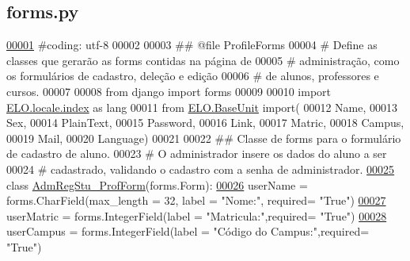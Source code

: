 \hypertarget{Adm_2forms_8py_source}{}\subsection{forms.\+py}
\label{Adm_2forms_8py_source}

\begin{DoxyCode}
\hypertarget{Adm_2forms_8py_source_l00001}{}\hyperlink{namespaceAdm_1_1forms}{00001} \textcolor{comment}{#coding: utf-8}
00002 
00003 \textcolor{comment}{## @file ProfileForms}
00004 \textcolor{comment}{#   Define as classes que gerarão as forms contidas na página de }
00005 \textcolor{comment}{#   administração, como os formulários de cadastro, deleção e edição}
00006 \textcolor{comment}{#   de alunos, professores e cursos.}
00007 
00008 \textcolor{keyword}{from} django \textcolor{keyword}{import} forms
00009 
00010 \textcolor{keyword}{import} \hyperlink{namespaceELO_1_1locale_1_1index}{ELO.locale.index} \textcolor{keyword}{as} lang
00011 \textcolor{keyword}{from} \hyperlink{namespaceELO_1_1BaseUnit}{ELO.BaseUnit} import(
00012     Name,
00013     Sex,
00014     PlainText,
00015     Password,
00016     Link,
00017     Matric,
00018     Campus,
00019     Mail,
00020     Language)
00021 
00022 \textcolor{comment}{## Classe de forms para o formulário de cadastro de aluno.}
00023 \textcolor{comment}{#   O administrador insere os dados do aluno a ser}
00024 \textcolor{comment}{#   cadastrado, validando o cadastro com a senha de administrador.}
\hypertarget{Adm_2forms_8py_source_l00025}{}\hyperlink{classAdm_1_1forms_1_1AdmRegStu__ProfForm}{00025} \textcolor{keyword}{class }\hyperlink{classAdm_1_1forms_1_1AdmRegStu__ProfForm}{AdmRegStu\_ProfForm}(forms.Form):
\hypertarget{Adm_2forms_8py_source_l00026}{}\hyperlink{classAdm_1_1forms_1_1AdmRegStu__ProfForm_a4e5391112a173e2d304e20c2cc8bca4d}{00026}     userName = forms.CharField(max\_length = 32, label = \textcolor{stringliteral}{"Nome:"}, required= \textcolor{stringliteral}{"True"})
\hypertarget{Adm_2forms_8py_source_l00027}{}\hyperlink{classAdm_1_1forms_1_1AdmRegStu__ProfForm_a8cd50b9437effd2fecd6e4c66c307e41}{00027}     userMatric = forms.IntegerField(label = \textcolor{stringliteral}{"Matricula:"},required= \textcolor{stringliteral}{"True"})
\hypertarget{Adm_2forms_8py_source_l00028}{}\hyperlink{classAdm_1_1forms_1_1AdmRegStu__ProfForm_a885786ae8be597f051f8e3ff65ddb02d}{00028}     userCampus = forms.IntegerField(label = \textcolor{stringliteral}{"Código do Campus:"},required= \textcolor{stringliteral}{"True"}) 

\end{DoxyCode}
